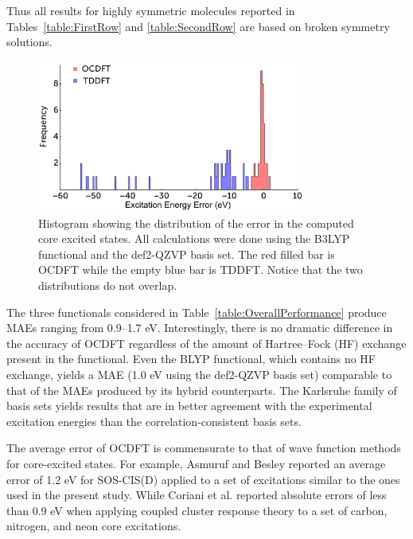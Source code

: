 \documentclass{article}
\begin{document}
Thus all results for highly symmetric molecules reported in Tables~\ref{table:FirstRow} and \ref{table:SecondRow} are based on broken symmetry solutions.
\begin{figure}[!h]
\centering
\includegraphics[width=8.8cm]{NEW_histogram2.pdf}
\caption{Histogram showing the distribution of the error in the computed core excited states. All calculations were done using the B3LYP functional and the def2-QZVP basis set. The red filled bar is OCDFT while the empty blue bar is TDDFT. Notice that the two distributions do not overlap.}
\label{figure:Hist}
\end{figure}
The three functionals considered in Table~\ref{table:OverallPerformance} produce MAEs ranging from 0.9--1.7 eV. Interestingly, there is no dramatic difference in the accuracy of OCDFT regardless of the amount of Hartree--Fock (HF) exchange present in the functional. Even the BLYP functional, which contains no HF exchange, yields a MAE (1.0 eV using the def2-QZVP basis set) comparable to that of the MAEs produced by its hybrid counterparts.
The Karlsruhe family of basis sets yields results that are in better agreement with the experimental excitation energies than the correlation-consistent basis sets.

The average error of OCDFT is commensurate to that of wave function methods for core-excited states. For example, Asmuruf and Besley\cite{asmuruf_calculation_2008} reported an average error of 1.2 eV for SOS-CIS(D) applied to a set of excitations similar to the ones used in the present study. While Coriani et al.\cite{coriani_coupled-cluster_2012} reported absolute errors of less than 0.9 eV when applying coupled cluster response theory to a set of carbon, nitrogen, and neon core excitations. 
\end{document}
